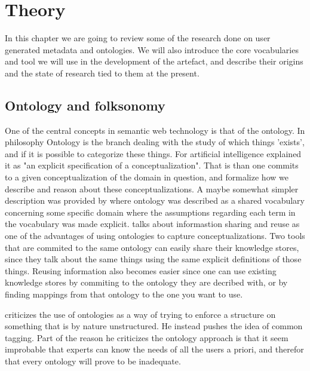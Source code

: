 
\chapter{Theory} %
\label{Theory} %

In this chapter we are going to review some of the research done on user generated metadata and ontologies.
We will also introduce the core vocabularies and tool we will use in the development of the artefact,
and describe their origins and the state of research tied to them at the present.

\section{Ontology and folksonomy}
One of the central concepts in semantic web technology is that of the ontology.
In philosophy Ontology is the branch dealing with the study of which things 'exists', and if it is possible to categorize these things.
For artificial intelligence \citet{Gruber1993} explained it as "an explicit specification of a conceptualization".
That is than one commits to a given conceptualization of the domain in question, and formalize how we describe and reason about these conceptualizations.
A maybe somewhat simpler description was provided by \citet{Guarino1998} where ontology was described as a shared vocabulary
concerning some specific domain where the assumptions regarding each term in the vocabulary was made explicit.
\citet{Pretorius2004} talks about informastion sharing and reuse as one of the advantages of using ontologies to
capture conceptualizations.
Two tools that are commited to the same ontology can easily share their knowledge stores,
since they talk about the same things using the same explicit definitions of those things.
Reusing information also becomes easier since one can use existing knowledge stores by commiting to the ontology they are
decribed with, or by finding mappings from that ontology to the one you want to use.


\citet{Shirky2007} criticizes the use of ontologies as a way of trying to enforce a structure on something that is by nature unstructured.
He instead pushes the idea of common tagging.
Part of the reason he criticizes the ontology approach is that it seem improbable that experts can know the needs of all the users a priori, and therefor that every ontology will prove to be inadequate.


